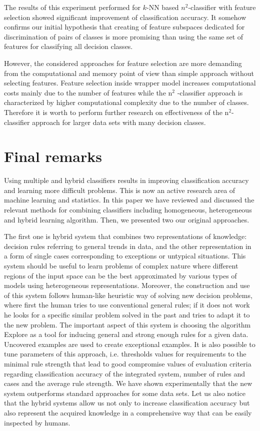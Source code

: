 \documentclass{article}
\begin{document}
The results of this experiment \cite{JelStefKr} performed for $k$-NN based $%
n^{2}$-classifier with feature selection showed significant improvement of
classification accuracy. It somehow confirms our initial hypothesis that
creating of feature subspaces dedicated for discrimination of pairs of
classes is more promising than using the same set of features for
classifying all decision classes.

However, the considered approaches for feature selection are more demanding
from the computational and memory point of view than simple approach without
selecting features. Feature selection inside wrapper model increases
computational costs mainly due to the number of features while the n$^2$%
-classifier approach is characterized by higher computational complexity due
to the number of classes. Therefore it is worth to perform further research
on effectiveness of the n$^2$-classifier approach for larger data sets with
many decision classes.

\section{Final remarks}

Using multiple and hybrid classifiers results in improving classification
accuracy and learning more difficult problems. This is now an active
research area of machine learning and statistics. In this paper we have
reviewed and discussed the relevant methods for combining classifiers
including homogeneous, heterogeneous and hybrid learning algorithm. Then, we
presented two our original approaches.

The first one is hybrid system that combines two representations
of knowledge: decision rules referring to general trends in data,
and the other representation in a form of single cases
corresponding to exceptions or untypical situations. This system
should be useful to learn problems of complex nature where
different regions of the input space can be the best approximated
by various types of models using heterogeneous representations.
Moreover, the construction and use of this system follows
human-like heuristic way of solving new decision problems, where
first the human tries to use conventional general rules; if it
does not work he looks for a specific similar problem solved in
the past and tries to adapt it to the new problem. The important
aspect of this system is choosing the algorithm Explore as a tool
for  inducing general and strong enough rules for a given data.
Uncovered examples are used to create exceptional examples. It is
also possible to tune parameters of this approach, i.e. thresholds
values for requirements to the minimal rule strength that lead to
good compromise values of evaluation criteria regarding
classification accuracy of the integrated system, number of rules
and cases and the average rule strength. We have shown
experimentally that the new system outperforms standard approaches
for some data sets. Let us also notice that the hybrid systems
allow us not only to increase classification accuracy but also
represent the acquired knowledge in a comprehensive way that can
be easily inspected by humans.
\end{document}
